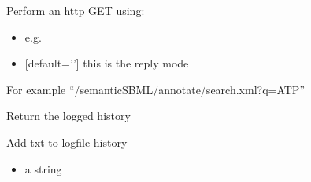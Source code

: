 \documentclass[letterpaper,10pt,english]{sphinxmanual}
\begin{document}
\begin{fulllineitems}

\begin{fulllineitems}
\label{\detokenize{modules_doc:cbmpy.CBNetDB.RESTClient.Get}}
\pysigstartsignatures
{}
\pysigstopsignatures
\sphinxAtStartPar
Perform an http GET using:
\begin{itemize}
\item {} 
\sphinxAtStartPar
{} e.g.

\item {} 
\sphinxAtStartPar
{} {[}default=’’{]} this is the reply mode

\end{itemize}

\sphinxAtStartPar
For example “/semanticSBML/annotate/search.xml?q=ATP”

\end{fulllineitems}


\begin{fulllineitems}
\label{\detokenize{modules_doc:cbmpy.CBNetDB.RESTClient.GetLog}}
\pysigstartsignatures
{}
\pysigstopsignatures
\sphinxAtStartPar
Return the logged history

\end{fulllineitems}


\begin{fulllineitems}
\label{\detokenize{modules_doc:cbmpy.CBNetDB.RESTClient.Log}}
\pysigstartsignatures
{}
\pysigstopsignatures
\sphinxAtStartPar
Add txt to logfile history
\begin{itemize}
\item {} 
\sphinxAtStartPar
{} a string

\end{itemize}

\end{fulllineitems}


\end{fulllineitems}
\end{document}
